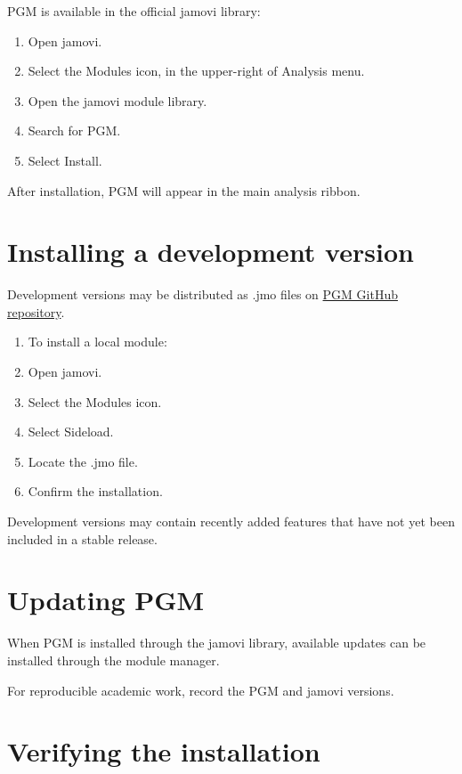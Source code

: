 \documentclass[
  english,
  letterpaper,
  DIV=11,
  numbers=noendperiod]{scrreprt}
\begin{document}
PGM is available in the official jamovi library:

\begin{enumerate}
\def\labelenumi{\arabic{enumi}.}
\item
  Open jamovi.
\item
  Select the Modules icon, in the upper-right of Analysis menu.
\item
  Open the jamovi module library.
\item
  Search for PGM.
\item
  Select Install.
\end{enumerate}

After installation, PGM will appear in the main analysis ribbon.

\section{Installing a development
version}\label{installing-a-development-version}

Development versions may be distributed as .jmo files on
\href{https://github.com/apessina/jamovi-PGM}{PGM GitHub repository}.

\begin{enumerate}
\def\labelenumi{\arabic{enumi}.}
\item
  To install a local module:
\item
  Open jamovi.
\item
  Select the Modules icon.
\item
  Select Sideload.
\item
  Locate the .jmo file.
\item
  Confirm the installation.
\end{enumerate}

Development versions may contain recently added features that have not
yet been included in a stable release.

\section{Updating PGM}\label{updating-pgm}

When PGM is installed through the jamovi library, available updates can
be installed through the module manager.

For reproducible academic work, record the PGM and jamovi versions.

\section{Verifying the installation}\label{verifying-the-installation}
\end{document}
